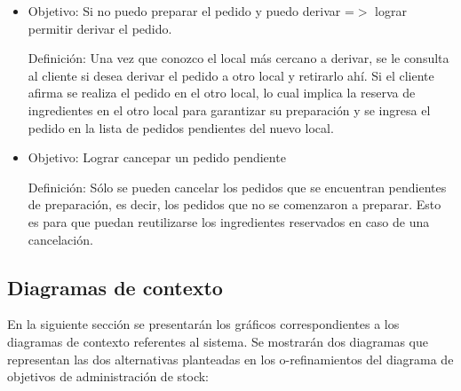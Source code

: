 \documentclass[a4paper,11pt] {article}
\begin{document}
\begin{itemize}
Definici\'on: Para cumplir con este objetivo, el sistema realiza una comunicaci\'on con sus locales m\'as cercanos donde les informa el pedido a preparar. Los locales al recibir la informaci\'on eval\'uan si tienen stock suficiente para satisfacer el pedido, de ser as\'i le informan al local que pueden y si no informan que no. Una vez que el local tiene los datos de sus locales vecinos, tiene la informaci\'on de cu\'al es el local m\'as cercano en el cu\'al se puede derivar un pedido.

\item 
Objetivo: Si no puedo preparar el pedido y puedo derivar =$>$ lograr permitir derivar el pedido.

Definici\'on: Una vez que conozco el local m\'as cercano a derivar, se le consulta al cliente si desea derivar el pedido a otro local y retirarlo ah\'i. Si el cliente afirma se realiza el pedido en el otro local, lo cual implica la reserva de ingredientes en el otro local para garantizar su preparaci\'on y se ingresa el pedido en la lista de pedidos pendientes del nuevo local.

\item 
Objetivo: Lograr cancepar un pedido pendiente

Definici\'on: S\'olo se pueden cancelar los pedidos que se encuentran pendientes de preparaci\'on, es decir, los pedidos que no se comenzaron a preparar. Esto es para que puedan reutilizarse los ingredientes reservados en caso de una cancelaci\'on.

\end{itemize}

\subsection*{Diagramas de contexto}

En la siguiente secci\'on se presentar\'an los gr\'aficos correspondientes a los diagramas de contexto referentes al sistema. Se mostrar\'an dos diagramas que representan las dos alternativas planteadas en los o-refinamientos del diagrama de objetivos de administraci\'on de stock: 
\end{document}
